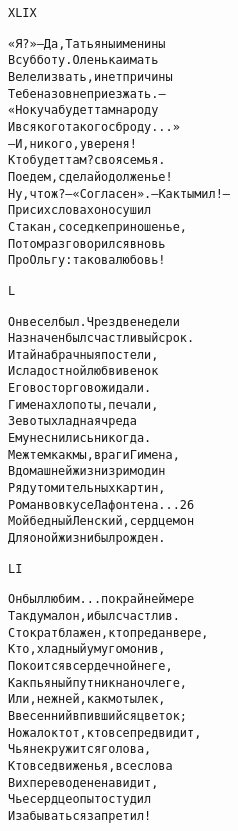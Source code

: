 \begin{minipage}[t]{\dimexpr 0.5\textwidth -\tabcolsep-.5pt}
\begin{alltt}\normalfont\centering
XLIX

«Я?» — Да, Татьяны именины
В субботу. Оленька и мать
Велели звать, и нет причины
Тебе на зов не приезжать. —
«Но куча будет там народу
И всякого такого сброду...»
— И, никого, уверен я!
Кто будет там? своя семья.
Поедем, сделай одолженье!
Ну, что ж? — «Согласен». — Как ты мил! —
При сих словах он осушил
Стакан, соседке приношенье,
Потом разговорился вновь
Про Ольгу: такова любовь!
\end{alltt}
\end{minipage}

\begin{minipage}[t]{\dimexpr 0.5\textwidth -\tabcolsep-.5pt}
\begin{alltt}\normalfont\centering
L

Он весел был. Чрез две недели
Назначен был счастливый срок.
И тайна брачныя постели,
И сладостной любви венок
Его восторгов ожидали.
Гимена хлопоты, печали,
Зевоты хладная чреда
Ему не снились никогда.
Меж тем как мы, враги Гимена,
В домашней жизни зрим один
Ряд утомительных картин,
Роман во вкусе Лафонтена... 26
Мой бедный Ленский, сердцем он
Для оной жизни был рожден.
\end{alltt}
\end{minipage}
\clearpage

\begin{minipage}[t]{\dimexpr 0.5\textwidth -\tabcolsep-.5pt}
\begin{alltt}\normalfont\centering
LI

Он был любим... по крайней мере
Так думал он, и был счастлив.
Стократ блажен, кто предан вере,
Кто, хладный ум угомонив,
Покоится в сердечной неге,
Как пьяный путник на ночлеге,
Или, нежней, как мотылек,
В весенний впившийся цветок;
Но жалок тот, кто все предвидит,
Чья не кружится голова,
Кто все движенья, все слова
В их переводе ненавидит,
Чье сердце опыт остудил
И забываться запретил!
\end{alltt}
\end{minipage}
\clearpage
